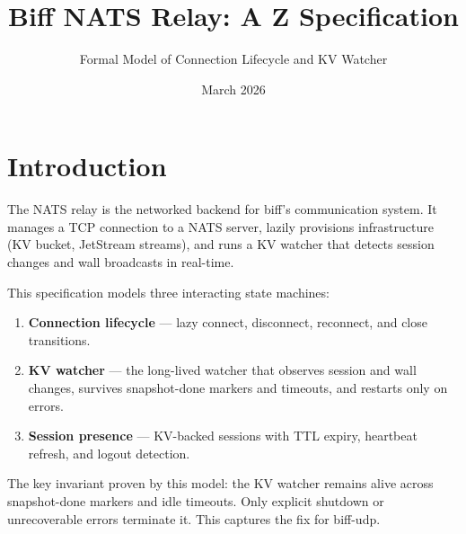 \documentclass[a4paper,10pt,fleqn]{article}
\begin{document}
\title{Biff NATS Relay: A Z Specification}
\author{Formal Model of Connection Lifecycle and KV Watcher}
\date{March 2026}
\maketitle

\tableofcontents
\newpage

\section{Introduction}

The NATS relay is the networked backend for biff's communication
system.  It manages a TCP connection to a NATS server, lazily
provisions infrastructure (KV bucket, JetStream streams), and runs
a KV watcher that detects session changes and wall broadcasts in
real-time.

This specification models three interacting state machines:

\begin{enumerate}
  \item \textbf{Connection lifecycle} --- lazy connect, disconnect,
    reconnect, and close transitions.
  \item \textbf{KV watcher} --- the long-lived watcher that observes
    session and wall changes, survives snapshot-done markers and
    timeouts, and restarts only on errors.
  \item \textbf{Session presence} --- KV-backed sessions with TTL
    expiry, heartbeat refresh, and logout detection.
\end{enumerate}

The key invariant proven by this model: the KV watcher remains
alive across snapshot-done markers and idle timeouts.  Only
explicit shutdown or unrecoverable errors terminate it.  This
captures the fix for biff-udp.
\end{document}
